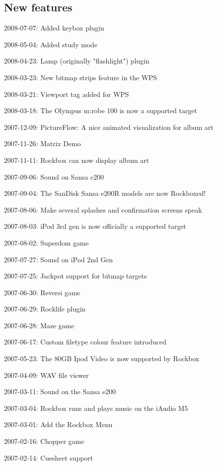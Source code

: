 \subsection{New features}
\begin{changelog}
\item 2008-07-07: Added keybox plugin
\item 2008-05-04: Added study mode
\item 2008-04-23: Lamp (originally "flashlight") plugin
\item 2008-03-23: New bitmap strips feature in the WPS
\item 2008-03-21: Viewport tag added for WPS
\item 2008-03-18: The Olympus m:robe 100 is now a supported target
\item 2007-12-09: PictureFlow: A nice animated visualization for album art
\item 2007-11-26: Matrix Demo
\item 2007-11-11: Rockbox can now display album art
\item 2007-09-06: Sound on Sansa c200
\item 2007-09-04: The SanDisk Sansa e200R models are now Rockboxed!
\item 2007-08-06: Make several splashes and confirmation screens speak
\item 2007-08-03: iPod 3rd gen is now officially a supported target 
\item 2007-08-02: Superdom game
\item 2007-07-27: Sound on iPod 2nd Gen
\item 2007-07-25: Jackpot support for bitmap targets
\item 2007-06-30: Reversi game
\item 2007-06-29: Rocklife plugin
\item 2007-06-28: Maze game
\item 2007-06-17: Custom filetype colour feature introduced 
\item 2007-05-23: The 80GB Ipod Video is now supported by Rockbox
\item 2007-04-09: WAV file viewer
\item 2007-03-11: Sound on the Sansa e200
\item 2007-03-04: Rockbox runs and plays music on the iAudio M5
\item 2007-03-01: Add the Rockbox Menu
\item 2007-02-16: Chopper game
\item 2007-02-14: Cuesheet support

\end{changelog}
